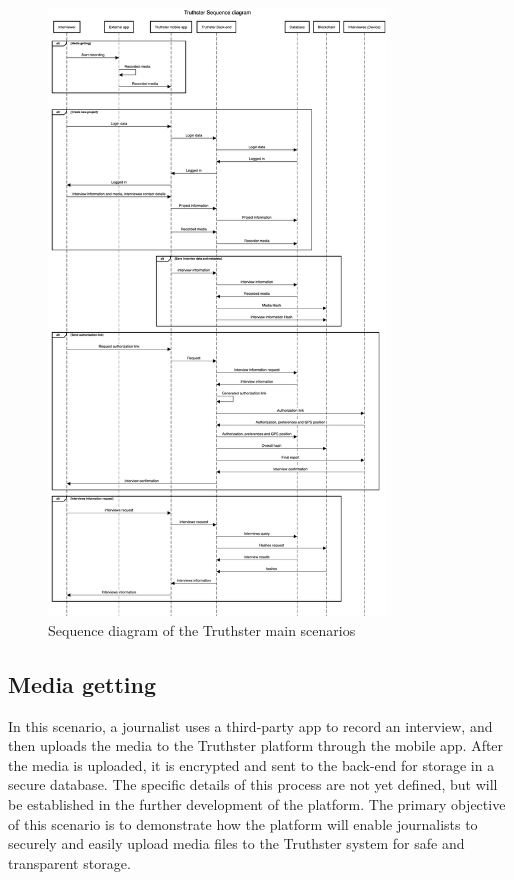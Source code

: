 \documentclass[target=mst,aauheader=]{thud}
\begin{document}
\begin{figure}
    \centering
    \includegraphics[width=0.8\textwidth]{images/sequenceDiagram.png}
    \caption{Sequence diagram of the Truthster main scenarios}
    \label{fig:sequenceDiagram}
\end{figure}

\subsection{Media getting}
\label{mediaGetting}

In this scenario, a journalist uses a third-party app to record an interview, and then uploads the media to the Truthster platform through the mobile app. After the media is uploaded, it is encrypted and sent to the back-end for storage in a secure database. The specific details of this process are not yet defined, but will be established in the further development of the platform. The primary objective of this scenario is to demonstrate how the platform will enable journalists to securely and easily upload media files to the Truthster system for safe and transparent storage.
\end{document}
